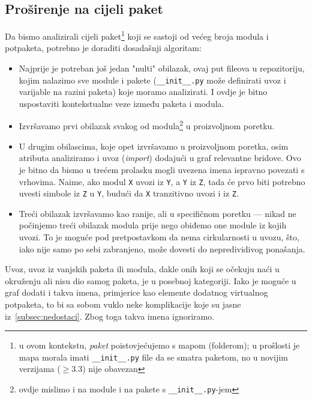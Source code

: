 \subsection{Proširenje na cijeli paket}
Da bismo analizirali cijeli paket\footnote{u ovom kontekstu, \emph{paket} poistovjećujemo s
mapom (folderom); u prošlosti je mapa
morala imati \texttt{__init__.py} file da se smatra paketom, no u novijim verzijama
($\ge$3.3) nije obavezan}
koji se sastoji od većeg broja modula i potpaketa, potrebno je doraditi dosadašnji algoritam:
\begin{itemize}
\item Najprije je potreban još jedan "nulti" obilazak, ovaj put fileova u repozitoriju, kojim
nalazimo sve module i pakete (\texttt{__init__.py} može definirati uvoz i varijable na razini paketa)
koje moramo analizirati. I ovdje je bitno uspostaviti kontekstualne veze između paketa i modula.

\item Izvršavamo prvi obilazak svakog od modula\footnote{ovdje mislimo i na module i na pakete s
\texttt{__init__.py}-jem}
u proizvoljnom poretku.

\item U drugim obilascima, koje opet izvršavamo u proizvoljnom poretka, osim atributa analiziramo i
uvoz (\emph{import}) dodajući u graf relevantne bridove.
Ovo je bitno da bismo u trećem prolasku mogli uvezena imena ispravno povezati s vrhovima. Naime,
ako modul \texttt{X} uvozi iz \texttt{Y}, a \texttt{Y} iz \texttt{Z}, tada će prvo biti potrebno
uvesti simbole iz \texttt{Z} u \texttt{Y}, budući da \texttt{X} tranzitivno
uvozi i iz \texttt{Z}.

\item Treći obilazak izvršavamo kao ranije, ali u specifičnom poretku --- nikad
ne počinjemo treći obilazak modula prije nego obiđemo one module iz kojih uvozi.
To je moguće pod pretpostavkom da nema cirkularnosti u uvozu, što, iako nije
samo po sebi zabranjeno, može dovesti do nepredividivog ponašanja.

\end{itemize}

Uvoz, uvoz iz vanjskih paketa ili modula, dakle onih koji se
očekuju naći u okruženju ali nisu dio samog paketa, je u posebnoj kategoriji.
Iako je moguće u graf dodati i takva imena, primjerice kao elemente
dodatnog virtualnog potpaketa, to bi sa sobom vuklo neke
komplikacije koje su jasne iz~\ref{subsec:nedostaci}. Zbog toga
takva imena ignoriramo.



